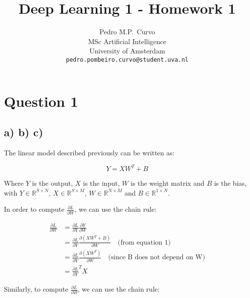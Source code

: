 \documentclass{article}
\title{Deep Learning 1 - Homework 1}
\author{%
  Pedro M.P.~Curvo \\
  MSc Artificial Intelligence\\
  University of Amsterdam\\
  \texttt{pedro.pombeiro.curvo@student.uva.nl} \\
}
\begin{document}
\maketitle




\section*{Question 1}

\subsection*{a) b) c)}

The linear model described previously can be written as:

\begin{equation}
    Y = X W^T + B
\end{equation}

Where $Y$ is the output, $X$ is the input, $W$ is the weight matrix and $B$ is the bias, with
$Y \in \mathbb{R}^{S \times N}$, $X \in \mathbb{R}^{S \times M}$, $W \in \mathbb{R}^{N \times M}$ and $B \in \mathbb{R}^{1 \times N}$.

In order to compute $\frac{\partial L}{\partial W}$, we can use the chain rule:

\begin{align*}
    \frac{\partial L}{\partial W} &= \frac{\partial L}{\partial Y} \frac{\partial Y}{\partial W} \\
    &= \frac{\partial L}{\partial Y} \frac{\partial (XW^T + B)}{\partial W} \quad \text{(from equation 1)} \\
    &= \frac{\partial L}{\partial Y} \frac{\partial (XW^T)}{\partial W} \quad \text{(since B does not depend on W)} \\
    &= \frac{\partial L}{\partial Y}^T X
\end{align*}

Similarly, to compute $\frac{\partial L}{\partial B}$, we can use the chain rule:
\end{document}
